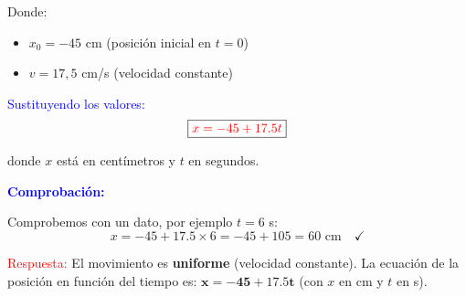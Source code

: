 \begin{exercise}
\begin{solu}
        Donde:
        \begin{itemize}
            \item $x_0 = -45$ cm (posición inicial en $t = 0$)
            \item $v = 17,5$ cm/s (velocidad constante)
        \end{itemize}

        \textcolor{blue}{Sustituyendo los valores:}
        \[
            \boxed{\textcolor{red}{x = -45 + 17.5t}}
        \]

        donde $x$ está en centímetros y $t$ en segundos.

        \vspace{0.3cm}

        \textbf{\textcolor{blue}{Comprobación:}}

        Comprobemos con un dato, por ejemplo $t = 6$ s:
        \[
            x = -45 + 17.5 \times 6 = -45 + 105 = 60 \text{ cm} \quad \checkmark
        \]

        \textcolor{red}{Respuesta:} El movimiento es \textbf{uniforme} (velocidad constante). La ecuación de la posición en función del tiempo es: $\mathbf{x = -45 + 17.5t}$ (con $x$ en cm y $t$ en s).
    \end{solu}
\end{exercise}




